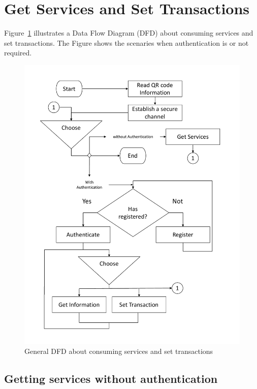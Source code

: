 \section{Get Services and Set Transactions}
\label{sec:Services}
Figure~\ref{fig:dfdForAuthServices} illustrates a Data Flow Diagram (DFD) about consuming  
services and set transactions. The Figure shows the scenaries when authentication is or 
not required.


\begin{figure}[bt]
  \centering
    \includegraphics[scale=0.4]{images/dfd.pdf}
        \caption{General DFD about consuming services and set transactions}
    \label{fig:dfdForAuthServices}
\end{figure}

\subsection{Getting services without authentication}
\label{ssec:getServNoAuth}

